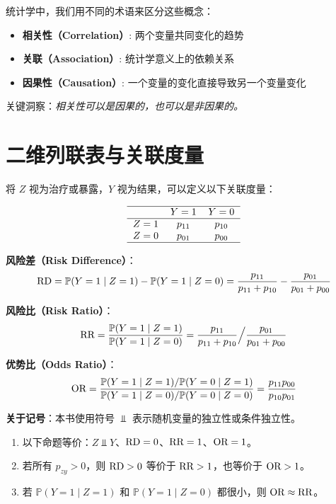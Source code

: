 统计学中，我们用不同的术语来区分这些概念：

\begin{itemize}
  \item \textbf{相关性（Correlation）}: 两个变量共同变化的趋势
  \item \textbf{关联（Association）}: 统计学意义上的依赖关系
  \item \textbf{因果性（Causation）}: 一个变量的变化直接导致另一个变量变化
\end{itemize}

关键洞察：\textit{相关性可以是因果的，也可以是非因果的。}

\section{二维列联表与关联度量}

将 $Z$ 视为治疗或暴露，$Y$ 视为结果，可以定义以下关联度量：

\[
\begin{tabular}{lcc}
\hline
        & $Y =1$ & $Y =0$\\\hline
$Z =1$ & $p_{11}$ & $p_{10}$\\
$Z =0$ & $p_{01}$ & $p_{00}$\\
\hline
\end{tabular}
\]

\textbf{风险差（Risk Difference）}：
\[
\text{RD} = \mathbb{P}(Y=1 \mid Z=1) - \mathbb{P}(Y=1 \mid Z=0)
= \frac{p_{11}}{p_{11} + p_{10}} - \frac{p_{01}}{p_{01} + p_{00}}
\]

\textbf{风险比（Risk Ratio）}：
\[
\text{RR} = \frac{\mathbb{P}(Y=1 \mid Z=1)}{\mathbb{P}(Y=1 \mid Z=0)}
= \frac{p_{11}}{p_{11} + p_{10}} \Big / \frac{p_{01}}{p_{01} + p_{00}}
\]

\textbf{优势比（Odds Ratio）}：
\[
\text{OR} = \frac{\mathbb{P}(Y=1 \mid Z=1)/\mathbb{P}(Y=0 \mid Z=1)}{\mathbb{P}(Y=1 \mid Z=0)/\mathbb{P}(Y=0 \mid Z=0)}
= \frac{p_{11} p_{00}}{p_{10} p_{01}}
\]

\textbf{关于记号}：本书使用符号 $\Perp$ 表示随机变量的独立性或条件独立性。

\begin{Proposition}[二维列联表中的独立性]\label{prop:2x2-independence}
\begin{enumerate}
  \item 以下命题等价：$Z \Perp Y$、$\text{RD} = 0$、$\text{RR} = 1$、$\text{OR} = 1$。
  \item 若所有 $p_{zy} > 0$，则 $\text{RD} > 0$ 等价于 $\text{RR} > 1$，也等价于 $\text{OR} > 1$。
  \item 若 $\mathbb{P}(Y=1 \mid Z=1)$ 和 $\mathbb{P}(Y=1 \mid Z=0)$ 都很小，则 $\text{OR} \approx \text{RR}$。
\end{enumerate}
\end{Proposition}

